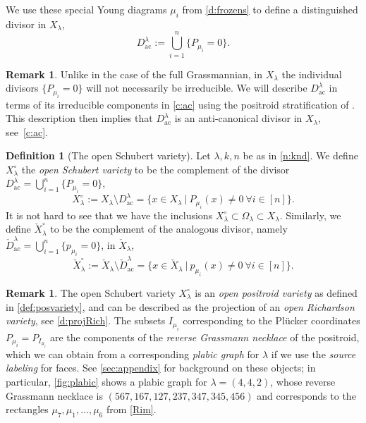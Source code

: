 \documentclass{amsart}
\theoremstyle{definition}
\newtheorem{definition}[thm]{Definition}
\newtheorem{rem}[thm]{Remark}
\numberwithin{equation}{section}
\newcommand{\openSchub}{{X_{\lambda}^{\circ}}}
\newcommand{\opencheckSchub}{{\check{X}_{\lambda}^{\circ}}}
\newcommand{\checkD}{\check{D}}
\newcommand{\ac}{\operatorname{ac}}
\begin{document}
We use these special Young diagrams $\mu_i$ 
from \cref{d:frozens} to  define a distinguished 
 divisor 
in $X_{\lambda}$, 
 \begin{equation}\label{e:boundarydivisor}
 D^{\lambda}_{\ac}:=\bigcup_{i=1}^n \{P_{\mu_i}=0\}.
 \end{equation}
 \begin{rem} Unlike in the case of the full Grassmannian, in $X_\lambda$ the individual divisors $\{P_{\mu_i}=0\}$ will not necessarily be irreducible. We will describe $D^{\lambda}_{\ac}$ in terms of its irreducible components in \cref{c:ac} using the positroid stratification of \cite{KLS}. This description then implies that $D_{\ac}^{\lambda}$ is an anti-canonical divisor in $X_{\lambda}$, see~\cref{c:ac}.
\end{rem}



\begin{definition}[The open Schubert variety]\label{d:openX}
Let $\lambda, k, n$ be as in \cref{n:knd}.
We define $\openSchub$ the \textit{open Schubert variety} to be the complement of the 
divisor 
	$D_{\ac}^{\lambda}=\bigcup_{i=1}^n \{P_{\mu_i}=0\}$, 
\begin{equation*}
	\openSchub:= X_{\lambda} \setminus  D_{\ac}^{\lambda} =\{x\in X_{\lambda}  \ | \ P_{\mu_i}(x)\ne 0 \ \forall i\in[n] \}.
\end{equation*}
It is not hard to see that we have the inclusions $\openSchub\subset\Omega_\lambda\subset X_\lambda$.  
Similarly, we define $\opencheckSchub$ to be the complement of the analogous divisor, namely
	$\checkD_{\ac}^{\lambda}=\bigcup_{i=1}^n \{p_{\mu_i}=0\}$, in $\check{X}_{\lambda}$,
\begin{equation*}
	\opencheckSchub:= \check{X}_{\lambda} \setminus  \checkD^{\lambda}_{\ac} =\{x\in \check{X}_{\lambda}  \ | \ p_{\mu_i}(x)\ne 0 \ \forall i\in[n] \}.
\end{equation*}
  \end{definition}
\begin{rem}\label{r:openSchub}
The open Schubert variety $\openSchub$ is an \emph{open positroid variety} 
as defined in \cref{def:posvariety}, 
	and can be described as the projection of an \emph{open Richardson variety},
	see \cref{d:projRich}.
The subsets $I_{\mu_i}$ corresponding to the Pl\"ucker coordinates $P_{\mu_i}=P_{I_{\mu_i}}$ are the components of the 
\emph{reverse Grassmann necklace} of the positroid, which we can obtain from a corresponding \emph{plabic graph} for $\lambda$ if we use the \emph{source labeling} for faces. 
See \cref{sec:appendix} for background on these objects;
in particular, \cref{fig:plabic} shows a plabic graph for $\lambda=(4,4,2)$, whose 
reverse Grassmann necklace is $(567, 167, 127, 237, 347, 345, 456)$ and corresponds
to the rectangles $\mu_7, \mu_1,\dots, \mu_6$ from 
\cref{Rim}.
\end{rem}
\end{document}
